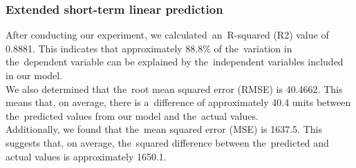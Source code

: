     \subsubsection{Extended short-term linear prediction} \label{subsec:res_estlp}
    After conducting our experiment, we calculated~an~R-squared (R2) value of 0.8881.
    This indicates that approximately 88.8\% of the~variation in the~dependent
    variable can be explained by the~independent variables included in our model.\\ 
    We also determined that the~root mean squared error (RMSE) is 40.4662.
    This means that, on average, there is a~difference of approximately 40.4
    units between the~predicted values from our model and the~actual values.\\
    Additionally, we found that the~mean squared error (MSE) is 1637.5.
    This suggests that, on average, the~squared difference between the~predicted
    and actual values is approximately 1650.1.
